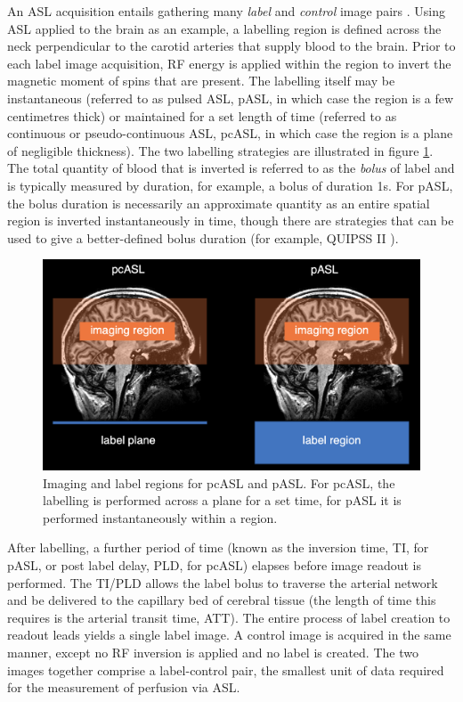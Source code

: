 \documentclass[12pt]{report}
\begin{document}
An ASL acquisition entails gathering many \textit{label} and \textit{control} image pairs \cite{asl_primer}. Using ASL applied to the brain as an example, a labelling region is defined across the neck perpendicular to the carotid arteries that supply blood to the brain. Prior to each label image acquisition, RF energy is applied within the region to invert the magnetic moment of spins that are present. The labelling itself may be instantaneous (referred to as pulsed ASL, pASL, in which case the region is a few centimetres thick) or maintained for a set length of time (referred to as continuous or pseudo-continuous ASL, pcASL, in which case the region is a plane of negligible thickness). The two labelling strategies are illustrated in figure \ref{label_regions}. The total quantity of blood that is inverted is referred to as the \textit{bolus} of label and is typically measured by duration, for example, a bolus of duration 1s. For pASL, the bolus duration is necessarily an approximate quantity as an entire spatial region is inverted instantaneously in time, though there are strategies that can be used to give a better-defined bolus duration (for example, QUIPSS II \cite{asl_primer}). 

\begin{figure}[h]
\centering
\includegraphics[width = \textwidth]{pcasl_pasl_regions.png}
\caption{Imaging and label regions for pcASL and pASL. For pcASL, the labelling is performed across a plane for a set time, for pASL it is performed instantaneously within a region.}
\label{label_regions}
\end{figure}

After labelling, a further period of time (known as the inversion time, TI, for pASL, or post label delay, PLD, for pcASL) elapses before image readout is performed. The TI/PLD allows the label bolus to traverse the arterial network and be delivered to the capillary bed of cerebral tissue (the length of time this requires is the arterial transit time, ATT). The entire process of label creation to readout leads yields a single label image. A control image is acquired in the same manner, except no RF inversion is applied and no label is created. The two images together comprise a label-control pair, the smallest unit of data required for the measurement of perfusion via ASL. 
\end{document}
